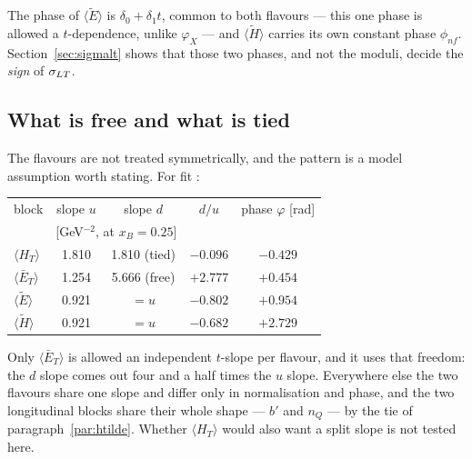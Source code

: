 The phase of $\langle\tilde E\rangle$ is $\delta_0 + \delta_1 t$, common to
both flavours --- this one phase is allowed a $t$-dependence, unlike
$\varphi_X$ --- and $\langle\tilde H\rangle$ carries its own constant phase
$\phi_{nf}$.  Section~\ref{sec:sigmalt} shows that those two phases, and not
the moduli, decide the \emph{sign} of $\sigma_{LT}$.

\subsection{What is free and what is tied}

The flavours are not treated symmetrically, and the pattern is a model
assumption worth stating.  For fit \texttt{\fittag}:

\begin{center}
\begin{tabular}{lcccc}
\toprule
block & slope $u$ & slope $d$ & $d/u$ & phase $\varphi$ [rad] \\
      & \multicolumn{2}{c}{[GeV$^{-2}$, at $x_B = 0.25$]} & & \\
\midrule
$\langle H_T\rangle$       & 1.810 & 1.810 (tied) & $-0.096$ & $-0.429$ \\
$\langle \bar E_T\rangle$  & 1.254 & 5.666 (free) & $+2.777$ & $+0.454$ \\
$\langle \tilde E\rangle$  & 0.921 & $= u$        & $-0.802$ & $+0.954$ \\
$\langle \tilde H\rangle$  & 0.921 & $= u$        & $-0.682$ & $+2.729$ \\
\bottomrule
\end{tabular}
\end{center}

\noindent
Only $\langle \bar E_T\rangle$ is allowed an independent $t$-slope per
flavour, and it uses that freedom: the $d$ slope comes out four and a half
times the $u$ slope.  Everywhere else the two flavours share one slope and
differ only in normalisation and phase, and the two longitudinal blocks share
their whole shape --- $b'$ and $n_Q$ --- by the tie of
paragraph~\ref{par:htilde}.  Whether $\langle H_T\rangle$ would also want a
split slope is not tested here.
